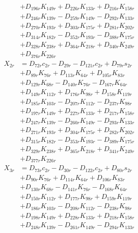 \begin{multicols}{2}
\begin{align}
&+ D_{196r}K_{149r} + D_{226r}K_{133r} + D_{216r}K_{158r}  \nonumber \\
&+ D_{246r}K_{139r} - D_{259r}K_{149r} - D_{292r}K_{133r}  \nonumber \\
&+ D_{270r}K_{193r} + D_{303r}K_{175r} + D_{281r}K_{202r}  \nonumber \\
&+ D_{314r}K_{182r} - D_{352r}K_{193r} - D_{388r}K_{175r}  \nonumber \\
&+ D_{328r}K_{238r} + D_{364r}K_{218r} + D_{340r}K_{249r}  \nonumber \\
&+ D_{376r}K_{226r} \nonumber \\
X_{2r} &= D_{72r}c_{2r} - D_{29r} - D_{121r}c_{2r} + D_{79r}s_{2r}  \nonumber \\
&+ D_{89r}K_{76r} + D_{113r}K_{64r} + D_{105r}K_{83r}  \nonumber \\
&+ D_{129r}K_{68r} - D_{140r}K_{76r} - D_{167r}K_{64r}  \nonumber \\
&+ D_{149r}K_{112r} + D_{176r}K_{98r} + D_{158r}K_{119r}  \nonumber \\
&+ D_{185r}K_{103r} - D_{207r}K_{112r} - D_{237r}K_{98r}  \nonumber \\
&+ D_{197r}K_{149r} + D_{227r}K_{133r} + D_{217r}K_{158r}  \nonumber \\
&+ D_{247r}K_{139r} - D_{260r}K_{149r} - D_{293r}K_{133r}  \nonumber \\
&+ D_{271r}K_{193r} + D_{304r}K_{175r} + D_{282r}K_{202r}  \nonumber \\
&+ D_{315r}K_{182r} - D_{353r}K_{193r} - D_{389r}K_{175r}  \nonumber \\
&+ D_{329r}K_{238r} + D_{365r}K_{218r} + D_{341r}K_{249r}  \nonumber \\
&+ D_{377r}K_{226r} \nonumber \\
X_{3r} &= D_{73r}c_{2r} - D_{30r} - D_{122r}c_{2r} + D_{80r}s_{2r}  \nonumber \\
&+ D_{90r}K_{76r} + D_{114r}K_{64r} + D_{106r}K_{83r}  \nonumber \\
&+ D_{130r}K_{68r} - D_{141r}K_{76r} - D_{168r}K_{64r}  \nonumber \\
&+ D_{150r}K_{112r} + D_{177r}K_{98r} + D_{159r}K_{119r}  \nonumber \\
&+ D_{186r}K_{103r} - D_{208r}K_{112r} - D_{238r}K_{98r}  \nonumber \\
&+ D_{198r}K_{149r} + D_{228r}K_{133r} + D_{218r}K_{158r}  \nonumber \\
&+ D_{248r}K_{139r} - D_{261r}K_{149r} - D_{294r}K_{133r}  \nonumber \\

\end{align}
\end{multicols}
